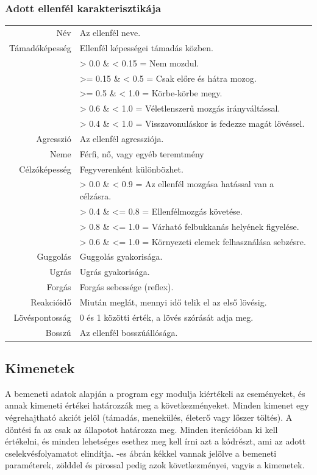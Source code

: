 \subsubsection{Adott ellenfél karakterisztikája}

\begin{tabular}{r|l}
Név & Az ellenfél neve. \\
Támadóképesség & Ellenfél képességei támadás közben.\\
&> 0.0 \& < 0.15 = Nem mozdul.\\
&>= 0.15 \& < 0.5 = Csak előre és hátra mozog.\\
&>= 0.5 \& < 1.0 = Körbe-körbe megy.\\
&> 0.6 \& < 1.0 = Véletlenszerű mozgás irányváltással.\\
&> 0.4 \& < 1.0 = Visszavonuláskor is fedezze magát lövéssel.\\
Agresszió & Az ellenfél agressziója.\\
Neme & Férfi, nő, vagy egyéb teremtmény\\
Célzóképesség & Fegyverenként különbözhet.\\
&> 0.0 \& < 0.9 = Az ellenfél mozgása hatással van a célzásra.\\
&> 0.4 \& <= 0.8 = Ellenfélmozgás követése.\\
&> 0.8 \& <= 1.0 = Várható felbukkanás helyének figyelése.\\
&> 0.6 \& <= 1.0 = Környezeti elemek felhasználása sebzésre.\\
Guggolás & Guggolás gyakorisága.\\
Ugrás & Ugrás gyakorisága.\\
Forgás & Forgás sebessége (reflex).\\
Reakcióidő & Miután meglát, mennyi idő telik el az első lövésig.\\
Lövéspontosság & 0 és 1 közötti érték, a lövés szórását adja meg.\\
Bosszú & Az ellenfél bosszúállósága.\\
\end{tabular}

\subsection{Kimenetek}

A bemeneti adatok alapján a program egy modulja kiértékeli az eseményeket, és annak kimeneti értékei határozzák meg a következményeket. Minden kimenet egy végrehajtható akciót jelöl (támadás, menekülés, életerő vagy lőszer töltés). A döntési fa az csak az állapotot határozza meg. Minden iterációban ki kell értékelni, és minden lehetséges esethez meg kell írni azt a kódrészt, ami az adott cselekvésfolyamatot elindítja. -es ábrán kékkel vannak jelölve a bemeneti paraméterek, zölddel és pirossal pedig azok következményei, vagyis a kimenetek.

